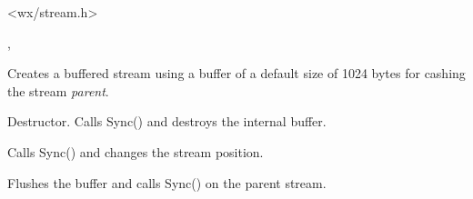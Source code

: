 <wx/stream.h>




, 


\label{wxbufferedoutputstreamctor}


Creates a buffered stream using a buffer of a default size of 1024 bytes for cashing
the stream {\it parent}.

\label{wxbufferedoutputstreamdtor}


Destructor. Calls Sync() and destroys the internal buffer.

\label{wxbufferedoutputstreamseeko}


Calls Sync() and changes the stream position.

\label{wxbufferedoutputstreamsync}


Flushes the buffer and calls Sync() on the parent stream.



